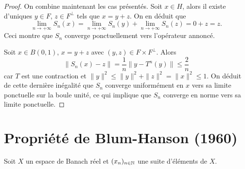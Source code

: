 \begin{proof}
  On combine maintenant les cas présentés. Soit $x\in H$, alors il existe
  d'uniques $y\in F$, $z\in F^{\perp}$ tels que $x = y + z$. On en déduit que
  $$\lim_{n\to+\infty}S_n(x) =
  \lim_{n\to+\infty}S_n(y) + \lim_{n\to+\infty}S_n(z)=
  0 + z = z.$$
  Ceci montre que $S_n$ converge ponctuellement vers l'opérateur annoncé.


  Soit $x\in B(0, 1)$, $x = y + z$ avec $(y, z)\in F\times F^\perp$.
  Alors $$\|S_n(x) - z \| = \frac{1}{n}\|y- T^n(y)\| \leq \frac{2}{n}$$
  car $T$ est une contraction et
  $\|y\|^2\leq \|y\|^2 + \|z\|^2 = \|x\|^2 \leq 1$. On déduit de cette
  dernière inégalité que $S_n$ converge uniformément en $x$ vers sa limite
  ponctuelle sur la boule
  unité, ce qui implique que $S_n$ converge en norme vers sa limite ponctuelle.
\end{proof}


\section{Propriété de Blum-Hanson (1960)}
\begin{df}
  Soit $X$ un espace de Banach réel et $(x_n)_{n\in\mathbb{N}}$ une suite d'éléments de
  $X$.
\end{df}
